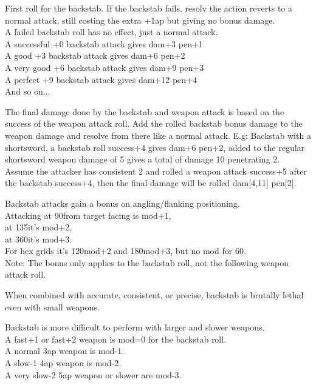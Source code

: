 First roll for the backstab. If the backstab fails, resolv the action reverts to a normal attack, still costing the extra +1ap but giving no bonus damage.\\
A failed backstab roll has no effect, just a normal attack.\\
A successful +0 backstab attack gives dam+3 pen+1 \\
A good +3 backstab attack gives dam+6 pen+2 \\
A very good +6 backstab attack gives dam+9 pen+3 \\
A perfect +9 backstab attack gives dam+12 pen+4 \\
And so on...

The final damage done by the backstab and weapon attack is based on the success of the weapon attack roll. Add the rolled backstab bonus damage to the weapon damage and resolve from there like a normal attack. E.g: Backstab with a shortsword, a backstab roll success+4 gives dam+6 pen+2, added to the regular shortsword weapon damage of 5 gives a total of damage 10 penetrating 2. Assume the attacker has consistent 2 and rolled a weapon attack success+5 after the backstab success+4, then the final damage will be rolled dam[4,11] pen[2].

Backstab attacks gain a bonus on angling/flanking positioning. \\
Attacking at 90\degrees from target facing is mod+1, \\
at 135\degrees it's mod+2, \\
at 360\degrees it's mod+3. \\
For hex grids it's 120\degrees mod+2 and 180\degrees mod+3, but no mod for 60\degree. \\
Note: The bonus only applies to the backstab roll, not the following weapon attack roll.

When combined with accurate, consistent, or precise, backstab is brutally lethal even with small weapons.

Backstab is more difficult to perform with larger and slower weapons.\\
A fast+1 or fast+2 weapon is mod=0 for the backstab roll.\\
A normal 3ap weapon is mod-1.\\
A slow-1 4ap weapon is mod-2.\\
A very slow-2 5ap weapon or slower are mod-3.



